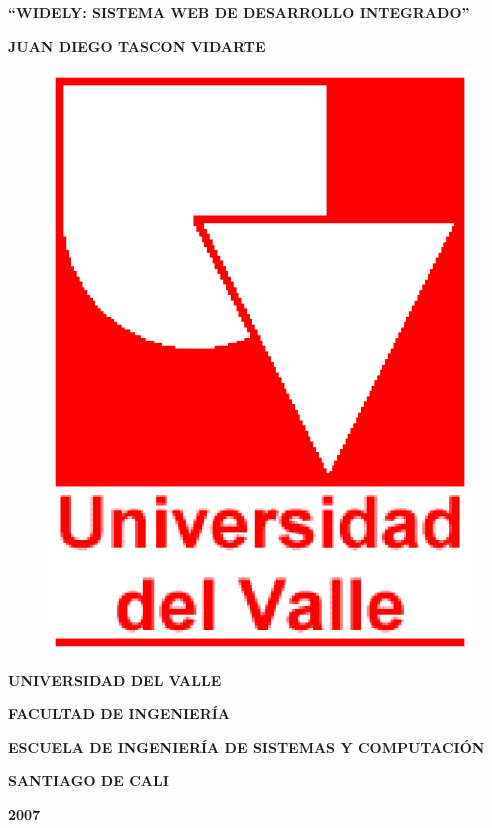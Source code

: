 
\begin{center} \textbf{\newline\newline} \end{center}
\begin{center} \textbf{``WIDELY: SISTEMA WEB DE DESARROLLO INTEGRADO''} \end{center}

\vspace{10em}

\begin{center} \textbf{JUAN DIEGO TASCON VIDARTE} \end{center}

\vspace{10em}


\begin{figure}[h]
	\centering
	\includegraphics[scale=0.3]{./img/uvlogo}
	\label{diagrama:uvlogo}
\end{figure}

\begin{center} \textbf{UNIVERSIDAD DEL VALLE} \end{center}
\begin{center} \textbf{FACULTAD DE INGENIERÍA} \end{center}
\begin{center} \textbf{ESCUELA DE INGENIERÍA DE SISTEMAS Y COMPUTACIÓN} \end{center}
\begin{center} \textbf{SANTIAGO DE CALI} \end{center}
\begin{center} \textbf{2007} \end{center}

